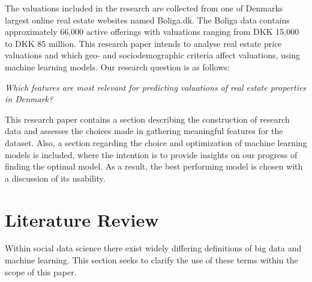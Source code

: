\documentclass[12pt,a4paper]{article}
\begin{document}
The valuations included in the research are collected from one of Denmarks largest online real estate websites named Boliga.dk. The Boliga data contains approximately 66,000 active offerings with valuations ranging from DKK 15,000 to DKK 85 million. This research paper intends to analyse real estate price valuations and which geo- and sociodemographic criteria affect valuations, using machine learning models. Our research question is as follows: 
\begin{center}
 \textit{Which features are most relevant for predicting valuations of real estate properties in Denmark?}
\end{center}
This research paper contains a section describing the construction of research data and assesses the choices made in gathering meaningful features for the dataset. Also, a section regarding the choice and optimization of machine learning models is included, where the intention is to provide insights on our progress of finding the optimal model. As a result, the best performing model is chosen with a discussion of its usability. 

\section{Literature Review}
Within social data science there exist widely differing definitions of big data and machine learning. This section seeks to clarify the use of these terms within the scope of this paper.
\end{document}
